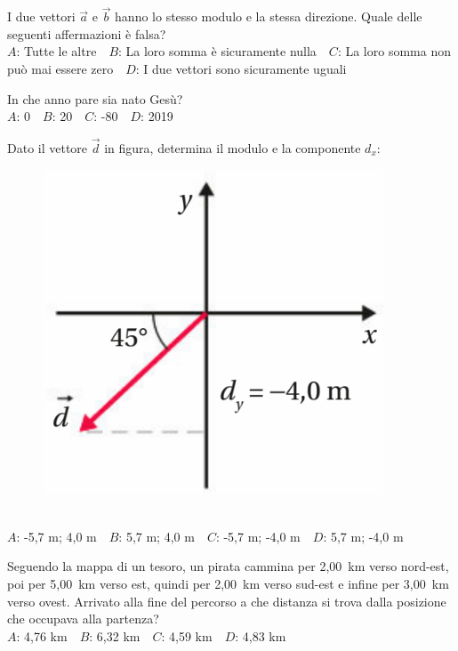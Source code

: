 \mcquestionheader I due vettori $\vec{a}$ e $\vec{b}$ hanno lo stesso modulo e la stessa direzione. Quale delle seguenti affermazioni è falsa?\\
{$A$}: Tutte le altre\ \ {$B$}: La loro somma è sicuramente nulla\ \ {$C$}: La loro somma non può mai essere zero\ \ {$D$}: I due vettori sono sicuramente uguali\ \ 

\mcquestionfooter



\def\mcquestionnumber{9}


\mcquestionheader In che anno pare sia nato Gesù?\\
{$A$}: 0\ \ {$B$}: 20\ \ {$C$}: -80\ \ {$D$}: 2019\ \ 

\mcquestionfooter



\def\mcquestionnumber{10}


\mcquestionheader Dato il vettore $\vec{d}$ in figura, determina il modulo e la componente $d_x$: \begin{figure}[h!]   \begin{center}     \includegraphics[scale=0.35]{vettored.png}   \end{center} \end{figure}\\
{$A$}: -5,7 m; 4,0 m\ \ {$B$}: 5,7 m; 4,0 m\ \ {$C$}: -5,7 m; -4,0 m\ \ {$D$}: 5,7 m; -4,0 m\ \ 

\mcquestionfooter



\def\mcquestionnumber{11}


\mcquestionheader Seguendo la mappa di un tesoro, un pirata cammina per 2,00~km verso nord-est, poi per 5,00~km verso est, quindi per 2,00~km verso sud-est e infine per 3,00~km verso ovest. Arrivato alla fine del percorso a che distanza si trova dalla posizione che occupava alla partenza?\\
{$A$}: 4,76 km\ \ {$B$}: 6,32 km\ \ {$C$}: 4,59 km\ \ {$D$}: 4,83 km\ \ 

